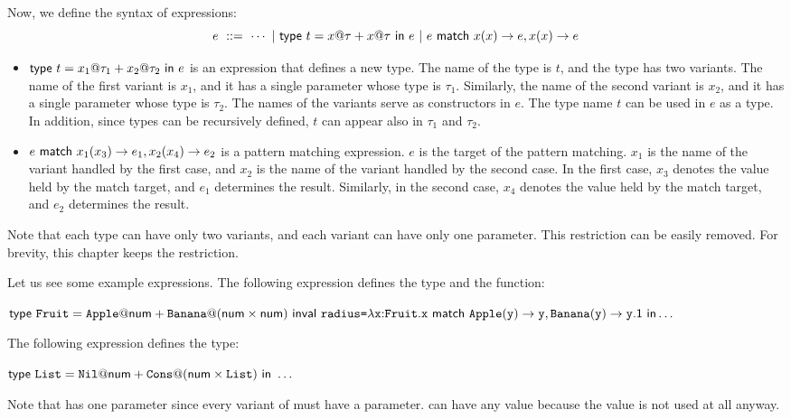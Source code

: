 Now, we define the syntax of expressions:
\[
e \ ::= \ \cdots
\ |\ \textsf{type}\ t=x@\tau+x@\tau\ \textsf{in}\ e
\ |\ e\ \textsf{match}\ x(x)\rightarrow e,x(x)\rightarrow e
\]

\begin{itemize}
  \item $\textsf{type}\ t=x_1@\tau_1+x_2@\tau_2\ \textsf{in}\ e$ is an expression that defines a new
    type. The name of the type is $t$, and the type has two variants. The name
    of the first variant is $x_1$, and it has a single parameter whose type is
    $\tau_1$. Similarly, the name of the second variant is $x_2$, and it has a
    single parameter whose type is $\tau_2$. The names of the variants serve
    as constructors in $e$. The type name $t$ can be used in $e$ as a type. In
    addition, since types can be recursively defined, $t$ can appear also in
    $\tau_1$ and $\tau_2$.
  \item $e\ \textsf{match}\ x_1(x_3)\rightarrow e_1,x_2(x_4)\rightarrow e_2$ is a pattern matching
    expression. $e$ is the target of the pattern matching. $x_1$ is the name of
    the variant handled by the first case, and $x_2$ is the name of the variant
    handled by the second case. In the first case, $x_3$ denotes the value held
    by the match target, and $e_1$ determines the result. Similarly, in the
    second case, $x_4$ denotes the value held by the match target, and $e_2$
    determines the result.
\end{itemize}

Note that each type can have only two variants, and each variant can have only
one parameter. This restriction can be easily removed. For brevity, this
chapter keeps the restriction.

Let us see some example expressions. The following expression defines the
 type and the  function:

$
\textsf{type}\ \texttt{Fruit}=\texttt{Apple}@\textsf{num}+\texttt{Banana}@(\textsf{num}\times\textsf{num})\ \textsf{in}\ \\
\textsf{val}\ \texttt{radius}\texttt{=}\lambda\texttt{x}{:}\texttt{Fruit}.
  \texttt{x}\ \textsf{match}\ \texttt{Apple}(\texttt{y})\rightarrow \texttt{y},\texttt{Banana}(\texttt{y})\rightarrow \texttt{y}\textsf{.1}
\ \textsf{in}\ \\
\ldots
$

The following expression defines the  type:

$
\textsf{type}\ \texttt{List}=\texttt{Nil}@\textsf{num}+\texttt{Cons}@(\textsf{num}\times\texttt{List})\ \textsf{in}\ \ldots$

Note that  has one parameter since every variant of \lang must have a
parameter.  can have any value because the value is not used at all anyway.

